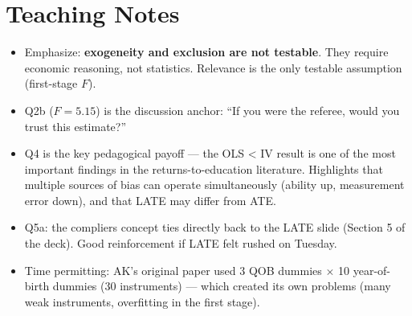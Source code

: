 \documentclass[11pt]{article}
\newcommand{\ans}[1]{%
  \vspace{2pt}%
  {\color{BrickRed}\textsc{\textbf{Answer.}}} \textit{#1}\par\vspace{4pt}%
}
\begin{document}
\begin{enumerate}

\end{enumerate}

\section*{Teaching Notes}

\begin{itemize}
  \item Emphasize: \textbf{exogeneity and exclusion are not testable}. They require economic reasoning, not statistics. Relevance is the only testable assumption (first-stage $F$).
  \item Q2b ($F = 5.15$) is the discussion anchor: ``If you were the referee, would you trust this estimate?''
  \item Q4 is the key pedagogical payoff --- the OLS < IV result is one of the most important findings in the returns-to-education literature. Highlights that multiple sources of bias can operate simultaneously (ability up, measurement error down), and that LATE may differ from ATE.
  \item Q5a: the compliers concept ties directly back to the LATE slide (Section 5 of the deck). Good reinforcement if LATE felt rushed on Tuesday.
  \item Time permitting: AK's original paper used 3 QOB dummies $\times$ 10 year-of-birth dummies (30 instruments) --- which created its own problems (many weak instruments, overfitting in the first stage).
\end{itemize}
\end{document}
